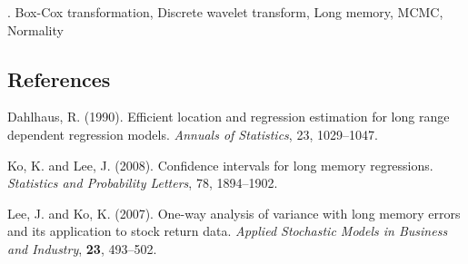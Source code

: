 \documentclass[12pt]{article}
\begin{document}
.
Box-Cox transformation, Discrete wavelet transform, Long memory, MCMC, Normality
%        
%
%        

\subsection*{References}

\begin{description}

\item
Dahlhaus, R. (1990). Efficient location and regression estimation for long range dependent regression models. 
\textit{Annuals of Statistics}, 23, 1029--1047.

\item
Ko, K. and Lee, J. (2008). Confidence intervals for long memory regressions. \textit{Statistics and Probability Letters}, 78, 1894--1902.

\item
Lee, J. and Ko, K. (2007). One-way analysis of variance with long memory errors and its application to stock return data.
\textit{Applied Stochastic Models in Business and Industry},
\textbf{23}, 493--502.

\end{description}
\end{document}
